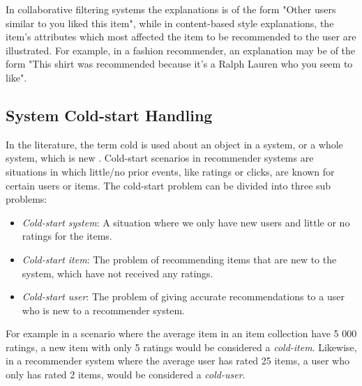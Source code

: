 In collaborative filtering systems the explanations is of the form "Other users
similar to you liked this item", while in content-based style explanations, the
item's attributes which most affected the item to be recommended to the user
are illustrated. For example, in a fashion recommender, an explanation may be
of the form "This shirt was recommended because it's a Ralph Lauren who you
seem to like".

\subsection{System Cold-start Handling}


In the literature, the term cold is used about an object in a system, or a
whole system, which is new \cite{Schein2002, Park2006}. Cold-start scenarios in
recommender systems are situations in which little/no prior events, like
ratings or clicks, are known for certain users or items. The cold-start problem
can be divided into three sub problems:

\begin{itemize}
  \item \emph{Cold-start system}: A situation where we only have new users and
  little or no ratings for the items.

  \item \emph{Cold-start item}: The problem of recommending items that are new
  to the system, which have not received any ratings.

  \item \emph{Cold-start user}: The problem of giving accurate recommendations
  to a user who is new to a recommender system.
\end{itemize}

For example in a scenario where the average item in an item collection have 5
000 ratings, a new item with only 5 ratings would be considered a
\emph{cold-item}. Likewise, in a recommender system where the average user has
rated 25 items, a user who only has rated 2 items, would be considered a
\emph{cold-user}.

